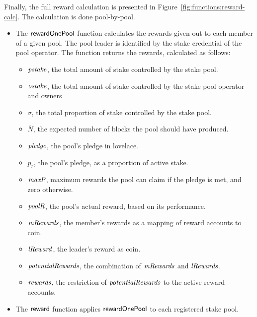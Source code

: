 Finally, the full reward calculation is presented in Figure~\ref{fig:functions:reward-calc}.
The calculation is done pool-by-pool.
\begin{itemize}
\item The $\mathsf{rewardOnePool}$ function calculates the rewards given out to
  each member of a given pool. The pool leader is identified by the stake
  credential of the pool operator. The function returns the rewards, calculated
  as follows:
    \begin{itemize}
      \item $\mathit{pstake}$, the total amount of stake controlled by the stake pool.
      \item $\mathit{ostake}$, the total amount of stake controlled by the stake pool operator
        and owners
      \item $\sigma$, the total proportion of stake controlled by the stake pool.
      \item $\overline{N}$, the expected number of blocks the pool should have produced.
      \item $\mathit{pledge}$, the pool's pledge in lovelace.
      \item $p_r$, the pool's pledge, as a proportion of active stake.
      \item $\mathit{maxP}$, maximum rewards the pool can claim if the pledge is met,
        and zero otherwise.
      \item $\mathit{poolR}$, the pool's actual reward, based on its performance.
      \item $\mathit{mRewards}$, the member's rewards as a mapping of reward accounts to coin.
      \item $\mathit{lReward}$, the leader's reward as coin.
      \item $\mathit{potentialRewards}$, the combination of $\mathit{mRewards}$ and $\mathit{lRewards}$.
      \item $\mathit{rewards}$, the restriction of $\mathit{potentialRewards}$ to the active
        reward accounts.
    \end{itemize}
  \item The $\mathsf{reward}$ function applies $\mathsf{rewardOnePool}$ to each registered stake pool.
\end{itemize}

